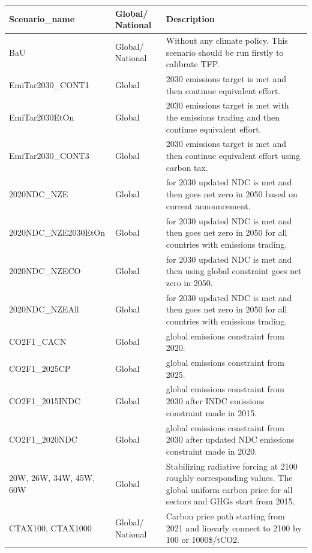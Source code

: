 \documentclass[10pt,a4paper,titlepage,dvipdfmx]{book}
\begin{document}
\begin{tabularx}{\textwidth}{|
p{}|
p{}|
p{}|} 
\caption{\label{tab:CliPolAssList}Climate policy assumptions list} \\
\hline 
Scenario\_name & Global/ National & Description \\\hline 
BaU & Global/ National & Without any climate policy. This scenario should be run firstly to calibrate TFP. \\\hline 
EmiTar2030\_CONT1 & Global & 2030 emissions target is met and then continue equivalent effort. \\\hline 
EmiTar2030EtOn & Global &2030 emissions target is met with the emissions trading and then continue equivalent effort. \\\hline 
EmiTar2030\_CONT3 & Global &2030 emissions target is met and then continue equivalent effort using carbon tax. \\\hline 
2020NDC\_NZE & Global &for 2030 updated NDC is met and then goes net zero in 2050 based on current announcement. \\\hline  
2020NDC\_NZE2030EtOn & Global &for 2030 updated NDC is met and then goes net zero in 2050 for all countries with emissions trading. \\\hline
2020NDC\_NZECO & Global &for 2030 updated NDC is met and then using global constraint goes net zero in 2050. \\\hline 
2020NDC\_NZEAll & Global &for 2030 updated NDC is met and then goes net zero in 2050 for all countries with emissions trading. \\\hline 
CO2F1\_CACN & Global &global emissions constraint from 2020. \\\hline  
CO2F1\_2025CP & Global &global emissions constraint from 2025. \\\hline 
CO2F1\_2015INDC & Global &global emissions constraint from 2030 after INDC emissions constraint made in 2015. \\\hline 
CO2F1\_2020NDC & Global &global emissions constraint from 2030 after updated NDC emissions constraint made in 2020. \\\hline 
20W, 26W, 34W, 45W, 60W & Global & Stabilizing radiative forcing at 2100 roughly corresponding values. The global uniform carbon price for all sectors and GHGs start from 2015. \\\hline 
CTAX100, CTAX1000 & Global/ National & Carbon price path starting from 2021 and linearly connect to 2100 by 100 or 1000\$/tCO2.  \\\hline 
\end{tabularx}
\end{document}
